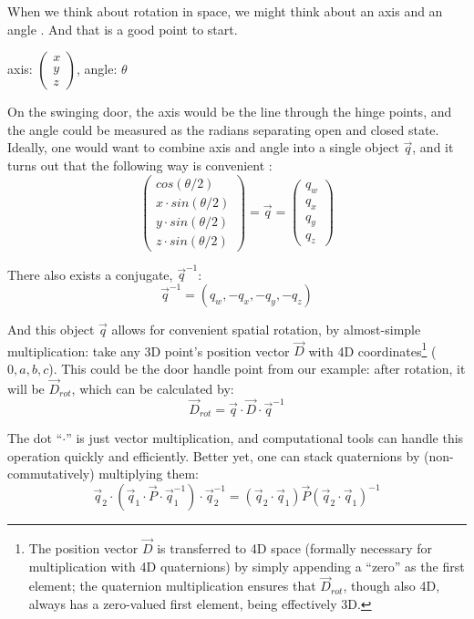 When we think about rotation in space, we might think about an axis and an angle .
And that is a good point to start.

\begin{center}
axis: \(\begin{pmatrix}x\\y\\z \end{pmatrix}\), angle: \(\theta\)
\end{center}

On the swinging door, the axis would be the line through the hinge points, and the angle could be measured as the radians separating open and closed state.
Ideally, one would want to combine axis and angle into a single object \(\vec{q}\), and it turns out that the following way is convenient \citep{Pennestri2010,Challis2020,Flashner2019}:
\begin{equation}\label{eqn:quaternion}
\begin{pmatrix}cos(\theta/2)\\x\cdot sin(\theta/2)\\y\cdot sin(\theta/2)\\z\cdot sin(\theta/2) \end{pmatrix} = \vec{q} = \begin{pmatrix}q_w\\q_x\\q_y\\q_z \end{pmatrix}
\end{equation}

There also exists a conjugate, \(\vec{q}^{-1}\):
\[\vec{q}^{-1} = (q_w, -q_x, -q_y, -q_z)\]


And this object \(\vec{q}\) allows for convenient spatial rotation, by almost-simple multiplication:
take any 3D point's position vector \(\vec{D}\) with 4D coordinates\footnote{The position vector \(\vec{D}\) is transferred to 4D space (formally necessary for multiplication with 4D quaternions) by simply appending a ``zero'' as the first element; the quaternion multiplication ensures that \(\vec{D}_{rot}\), though also 4D, always has a zero-valued first element, being effectively 3D.} (\(0, a, b, c\)).
This could be the door handle point from our example: after rotation, it will be \(\vec{D}_{rot}\), which can be calculated by:
\[\vec{D}_{rot} = \vec{q}\cdot \vec{D}\cdot \vec{q}^{-1}\]


The dot ``\(\cdot\)'' is just vector multiplication, and computational tools can handle this operation quickly and efficiently.
Better yet, one can stack quaternions by (non-commutatively) multiplying them:
\[ \vec{q}_2 \cdot \left( \vec{q}_1\cdot \vec{P}\cdot \vec{q}_1^{-1}\right) \cdot \vec{q}_2^{-1} = (\vec{q}_2\cdot \vec{q}_1) \vec{P} (\vec{q}_2\cdot \vec{q}_1)^{-1} \]

